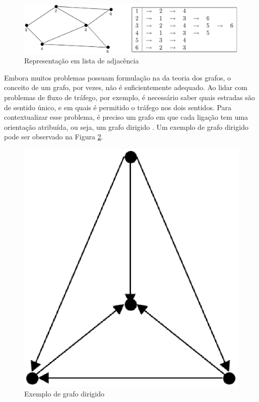 \begin{figure}[!h]
	\centering
	\includegraphics[scale=0.3]{figuras/capitulo2/lista_adjacencia.eps}
	\caption{Representação em lista de adjacência}
	\label{lista_adjacencia}
\end{figure}

Embora muitos problemas possuam formulação na da teoria dos grafos, o conceito de um grafo, por vezes, não é suficientemente adequado. Ao lidar com problemas de fluxo de tráfego, por exemplo, é necessário saber quais estradas são de sentido único, e em quais é permitido o tráfego nos dois sentidos. Para contextualizar esse problema, é preciso um grafo em que cada ligação tem uma orientação atribuída, ou seja, um grafo dirigido \cite{Bondy:2007}. Um exemplo de grafo dirigido pode ser observado na Figura \ref{dirigido}.

\begin{figure}[!h]
	\centering
	\includegraphics[scale=0.15]{figuras/capitulo2/dirigido.eps}
	\caption{Exemplo de grafo dirigido}
	\label{dirigido}
\end{figure}

